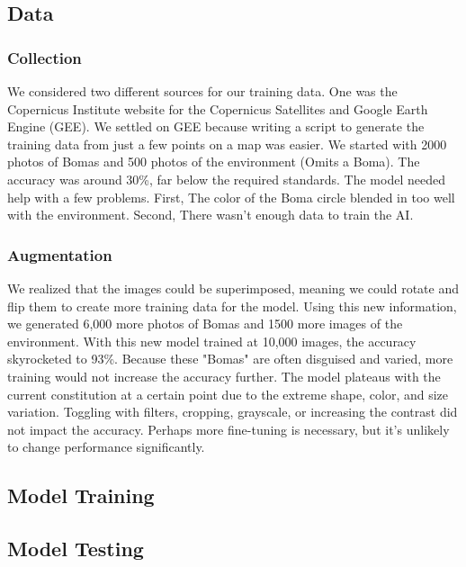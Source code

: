 \documentclass[10pt]{article}
\begin{document}
\subsection{Data}

\subsubsection{Collection}

We considered two different sources for our training data. One was the Copernicus Institute website for the Copernicus Satellites and Google Earth Engine (GEE). We settled on GEE because writing a script to generate the training data from just a few points on a map was easier. We started with 2000 photos of Bomas and 500 photos of the environment (Omits a Boma). The accuracy was around 30\%, far below the required standards. The model needed help with a few problems. First, The color of the Boma circle blended in too well with the environment. Second, There wasn’t enough data to train the AI.


\subsubsection{Augmentation}

We realized that the images could be superimposed, meaning we could rotate and flip them to create more training data for the model. Using this new information, we generated 6,000 more photos of Bomas and 1500 more images of the environment. With this new model trained at 10,000 images, the accuracy skyrocketed to 93\%. Because these "Bomas" are often disguised and varied, more training would not increase the accuracy further. The model plateaus with the current constitution at a certain point due to the extreme shape, color, and size variation. Toggling with filters, cropping, grayscale, or increasing the contrast did not impact the accuracy. Perhaps more fine-tuning is necessary, but it's unlikely to change performance significantly.

\subsection{Model Training}


\subsection{Model Testing}
\end{document}
